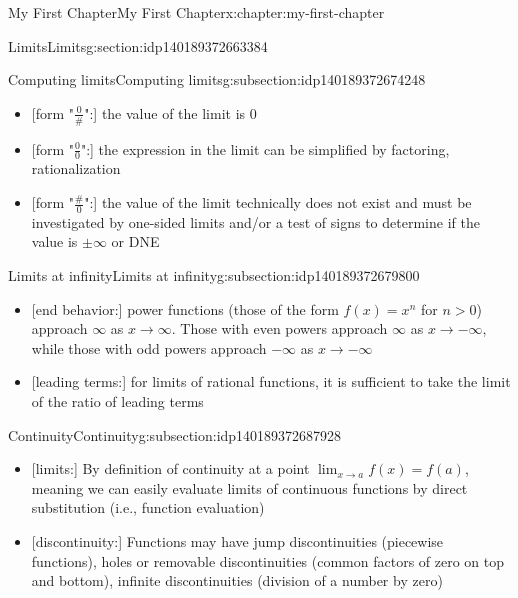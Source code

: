 \documentclass[oneside,10pt,]{book}
\begin{document}
\begin{chapterptx}{My First Chapter}{}{My First Chapter}{}{}{x:chapter:my-first-chapter}
\begin{sectionptx}{Limits}{}{Limits}{}{}{g:section:idp140189372663384}
\begin{subsectionptx}{Computing limits}{}{Computing limits}{}{}{g:subsection:idp140189372674248}
%
\begin{itemize}[label=\textbullet]
\item{}[form "\(\frac{0}{\#}\)":] the value of the limit is \(0\)%
\item{}[form "\(\frac{0}{0}\)":] the expression in the limit can be simplified by factoring, rationalization%
\item{}[form "\(\frac{\#}{0}\)":] the value of the limit technically does not exist and must be investigated by one-sided limits and\slash{}or a test of signs to determine if the value is \(\pm\infty\) or DNE%
\end{itemize}
\end{subsectionptx}
%
%
\typeout{************************************************}
\typeout{************************************************}
%
\begin{subsectionptx}{Limits at infinity}{}{Limits at infinity}{}{}{g:subsection:idp140189372679800}
%
\begin{itemize}[label=\textbullet]
\item{}[end behavior:] power functions (those of the form \(f(x) = x^n\) for \(n>0\)) approach \(\infty\) as \(x\to\infty\). Those with even powers approach \(\infty\) as \(x\to-\infty\), while those with odd powers approach \(-\infty\) as \(x\to-\infty\)%
\item{}[leading terms:] for limits of rational functions, it is sufficient to take the limit of the ratio of leading terms%
\end{itemize}
\end{subsectionptx}
%
%
\typeout{************************************************}
\typeout{************************************************}
%
\begin{subsectionptx}{Continuity}{}{Continuity}{}{}{g:subsection:idp140189372687928}
%
\begin{itemize}[label=\textbullet]
\item{}[limits:] By definition of continuity at a point \(\displaystyle\lim_{x\to a} f(x) = f(a)\), meaning we can easily evaluate limits of continuous functions by direct substitution (i.e., function evaluation)%
\item{}[discontinuity:] Functions may have jump discontinuities (piecewise functions), holes or removable discontinuities (common factors of zero on top and bottom), infinite discontinuities (division of a number by zero)%
\end{itemize}
\end{subsectionptx}

\end{sectionptx}
\end{chapterptx}
\end{document}
